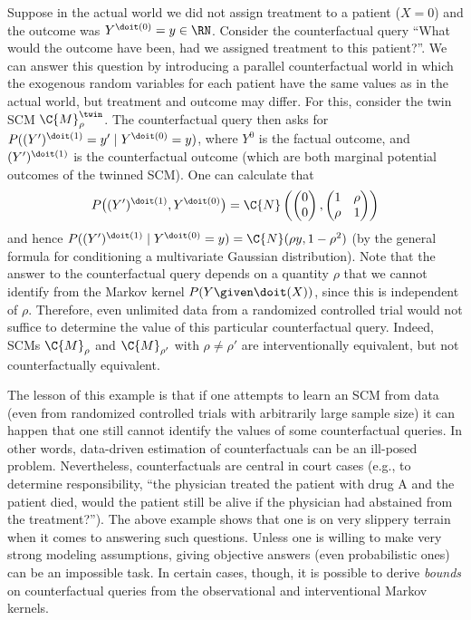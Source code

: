 \begin{Eg}
Suppose in the actual world we did not assign treatment to a patient ($X=0$) and the outcome was $Y^{\doit(0)}=y \in\RN$. 
Consider the counterfactual query ``What would the outcome have been, had we assigned treatment to this patient?''. 
We can answer this question by introducing a parallel counterfactual world in which the exogenous random variables for each
patient have the same values as in the actual world, but treatment and outcome may differ. For this, consider the
twin SCM $\C{M}_{\rho}^{\twin}$.
The counterfactual query then asks for $P((Y')^{\doit(1)}=y'\mid Y^{\doit(0)}=y)$, where $Y^0$ is the factual outcome, and
$(Y')^{\doit(1)}$ is the counterfactual outcome (which are both marginal potential outcomes of the twinned SCM). One can calculate that
$$
  P\big((Y')^{\doit(1)},Y^{\doit(0)}\big) = \C{N}\left(\begin{pmatrix}0\\ 0\end{pmatrix}, \begin{pmatrix} 1 & \rho \\ \rho & 1 \end{pmatrix}\right)
$$
and hence $P((Y')^{\doit(1)} \mid Y^{\doit(0)}=y) = \C{N}(\rho y,1-\rho^2)$ (by the general formula for conditioning a multivariate Gaussian distribution). Note that the answer to the counterfactual query depends on a quantity $\rho$ that we cannot identify from the Markov kernel $P(Y\given \doit (X))$, since this is independent of $\rho$. Therefore, even unlimited data from a randomized controlled trial would not suffice to determine the value of this particular counterfactual query.
Indeed, SCMs $\C{M}_{\rho}$ and $\C{M}_{\rho'}$ with $\rho\neq\rho'$ are interventionally equivalent, but not counterfactually equivalent.
\end{Eg}
The lesson of this example is that if one attempts to learn an SCM from data (even from randomized controlled trials with arbitrarily large sample size) it can happen that one still cannot identify the values of some counterfactual queries. 
In other words, data-driven estimation of counterfactuals can be an ill-posed problem. 
Nevertheless, counterfactuals are central in court cases (e.g., to determine responsibility, ``the physician treated the patient with drug A and the patient died, would the patient still be alive if the physician had abstained from the treatment?''). 
The above example shows that one is on very slippery terrain when it comes to answering such questions. 
Unless one is willing to make very strong modeling assumptions, giving objective answers (even probabilistic ones) can be an impossible task.
In certain cases, though, it is possible to derive \emph{bounds} on counterfactual queries from the observational and interventional Markov kernels.

